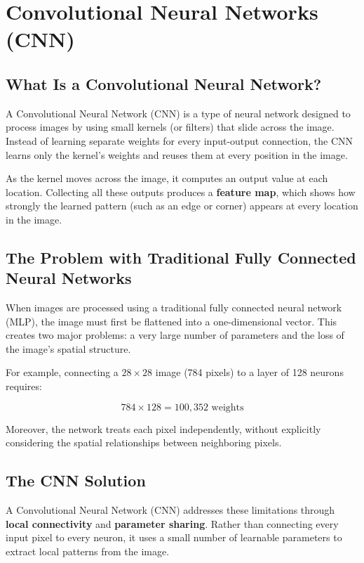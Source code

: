 \chapter{Convolutional Neural Networks (CNN)}

\section{What Is a Convolutional Neural Network?}

A Convolutional Neural Network (CNN) is a type of neural network designed to process images by using small kernels (or filters) that slide across the image. Instead of learning separate weights for every input-output connection, the CNN learns only the kernel's weights and reuses them at every position in the image.

As the kernel moves across the image, it computes an output value at each location. Collecting all these outputs produces a \textbf{feature map}, which shows how strongly the learned pattern (such as an edge or corner) appears at every location in the image.

\section{The Problem with Traditional Fully Connected Neural Networks}

When images are processed using a traditional fully connected neural network (MLP), the image must first be flattened into a one-dimensional vector. This creates two major problems: a very large number of parameters and the loss of the image's spatial structure.

For example, connecting a $28 \times 28$ image (784 pixels) to a layer of 128 neurons requires:

\[
784 \times 128 = 100,352 \text{ weights}
\]

Moreover, the network treats each pixel independently, without explicitly considering the spatial relationships between neighboring pixels.

\section{The CNN Solution}

A Convolutional Neural Network (CNN) addresses these limitations through \textbf{local connectivity} and \textbf{parameter sharing}. Rather than connecting every input pixel to every neuron, it uses a small number of learnable parameters to extract local patterns from the image.

